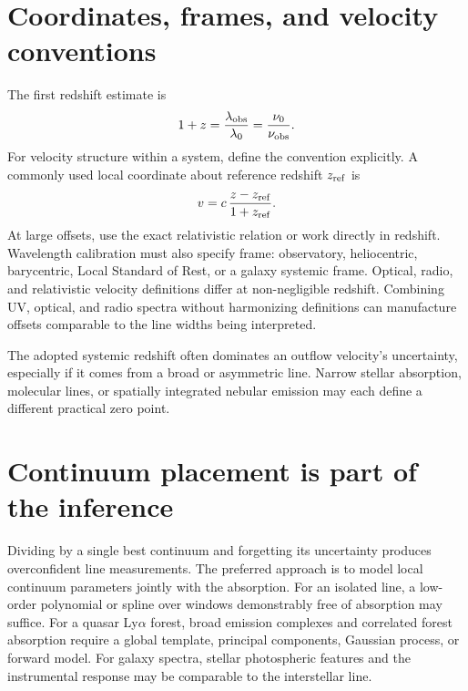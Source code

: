 \section{Coordinates, frames, and velocity conventions}

The first redshift estimate is
\begin{equation}
 1+z = \frac{\lambda_{\rm obs}}{\lambda_0}
     = \frac{\nu_0}{\nu_{\rm obs}}.
 \label{eq:redshift}
\end{equation}
For velocity structure within a system, define the convention explicitly. A
commonly used local coordinate about reference redshift $z_{\rm ref}$ is
\begin{equation}
 v=c\,\frac{z-z_{\rm ref}}{1+z_{\rm ref}}.
 \label{eq:local-velocity}
\end{equation}
At large offsets, use the exact relativistic relation or work directly in
redshift. Wavelength calibration must also specify frame: observatory,
heliocentric, barycentric, Local Standard of Rest, or a galaxy systemic frame.
Optical, radio, and relativistic velocity definitions differ at non-negligible
redshift. Combining UV, optical, and radio spectra without harmonizing
definitions can manufacture offsets comparable to the line widths being
interpreted.

The adopted systemic redshift often dominates an outflow velocity's
uncertainty, especially if it comes from a broad or asymmetric line. Narrow
stellar absorption, molecular lines, or spatially integrated nebular emission
may each define a different practical zero point.

\section{Continuum placement is part of the inference}

Dividing by a single best continuum and forgetting its uncertainty produces
overconfident line measurements. The preferred approach is to model local
continuum parameters jointly with the absorption. For an isolated line, a
low-order polynomial or spline over windows demonstrably free of absorption
may suffice. For a quasar Ly$\alpha$ forest, broad emission complexes and
correlated forest absorption require a global template, principal components,
Gaussian process, or forward model. For galaxy spectra, stellar photospheric
features and the instrumental response may be comparable to the interstellar
line.

